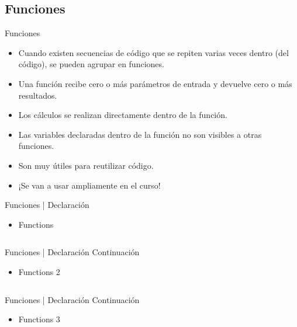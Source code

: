 \documentclass[usenames, dvipsnames, compress]{beamer}
\begin{document}
	\subsection{Funciones}
	\begin{frame}{Funciones}
		\begin{itemize}[<+- | alert@ +>]
			\item Cuando existen secuencias de código que se repiten varias veces dentro (del código), se pueden agrupar en funciones.
			\item Una función recibe cero o más parámetros de entrada y devuelve cero o más resultados.
			\item Los cálculos se realizan directamente dentro de la función.
			\item Las variables declaradas dentro de la función no son visibles a otras funciones.
			\item Son muy útiles para reutilizar código.
			\item ¡Se van a usar ampliamente en el curso!
		\end{itemize}
	\end{frame}
	\begin{frame}{Funciones | Declaración}
	\begin{itemize}
		\item \begin{block}{Functions}
			\inputminted[xleftmargin=\parindent,linenos]{python}{codes/decl_functions.m}
		\end{block}
	\end{itemize}
	\end{frame}
	\begin{frame}{Funciones | Declaración Continuación}
	\begin{itemize}
		\item [] \begin{block}{Functions 2}
			\inputminted[xleftmargin=\parindent,linenos]{python}{codes/decl_functions2.m}
		\end{block}
	\end{itemize}
	\end{frame}
	\begin{frame}{Funciones | Declaración Continuación}
	\begin{itemize}
		\item [] \begin{block}{Functions 3}
			\inputminted[xleftmargin=\parindent,linenos]{python}{codes/decl_functions3.m}
		\end{block}
	\end{itemize}
	\end{frame}
\end{document}
